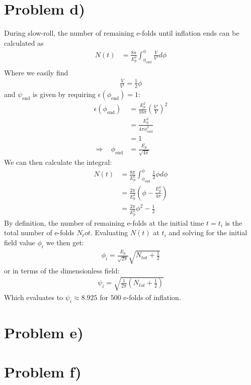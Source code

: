 \documentclass[reprint,english,notitlepage]{revtex4-1}  %
\numberwithin{equation}{section}
\begin{document}
\section{Problem d)}
During slow-roll, the number of remaining e-folds until inflation ends can be
calculated as
\begin{align}
	N(t) &= \frac{8\pi}{E_p^2} \int_{\phi_{\mathrm{end}}}^\phi \frac{V}{V'} d\phi \\
\end{align}
Where we easily find
\begin{align}
	\frac{V}{V'} = \frac{1}{2}\phi
\end{align}
and $\psi_{\mathrm{end}}$ is given by requiring $\epsilon(\phi_{\mathrm{end}})=1$:
\begin{align}
	\epsilon(\phi_{\mathrm{end}}) &= \frac{E_p^2}{16\pi} \left(\frac{V'}{V}\right)^2 \\
											 &= \frac{E_p^2}{4\pi \phi_{\mathrm{end}}^2} \\
											 &= 1 \\
	\Rightarrow \ \ \ \ \phi_{\mathrm{end}} &= \frac{E_p}{\sqrt{4\pi}}
\end{align}
We can then calculate the integral:
\begin{align}
	N(t) &= \frac{8\pi}{E_p^2} \int_{\phi_{\mathrm{end}}}^\phi \frac{1}{2}\phi d\phi \\
					&= \frac{2\pi}{E_p^2} \left(\phi -\frac{E_p^2}{4\pi} \right) \\
					&= \frac{2\pi}{E_p^2} \phi^2 - \frac{1}{2}
\end{align}
By definition, the number of remaining e-folds at the initial time $t=t_i$ is
the total number of e-folds $N_tot$. Evaluating $N(t)$ at $t_i$ and solving for
the initial field value $\phi_i$ we then get:
\begin{align}
	\phi_i = \frac{E_p}{\sqrt{2\pi}}\sqrt{N_{tot} + \frac{1}{2}}
\end{align}
or in terms of the dimensionless field:
\begin{align}
	\psi_i = \sqrt{ \frac{1}{2\pi} \left(N_{tot} + \frac{1}{2} \right) }
\end{align}
Which evaluates to $\psi_i \approx 8.925$ for $500$ e-folds of inflation.

\section{Problem e)}
\section{Problem f)}
\end{document}
